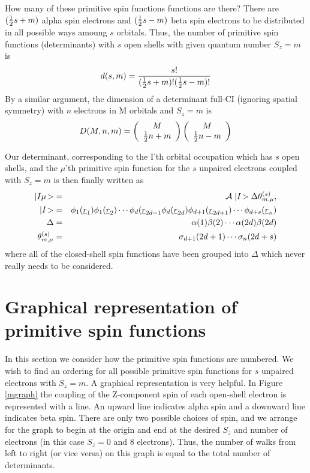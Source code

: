 How many of these primitive spin functions functions are there?  There
are $(\frac{1}{2} s + m)$ alpha spin electrons and $(\frac{1}{2} s -
m)$ beta spin electrons to be distributed in all possible ways amoung
$s$ orbitals.  Thus, the number of primitive spin functions
(determinants) with $s$ open shells with given quantum number
$S_z=m$ is
\begin{equation}
d(s,m) = \frac{s!}{(\frac{1}{2} s + m)! (\frac{1}{2} s - m)!}
\end{equation}
By a similar argument, the dimension of a determinant full-CI
(ignoring spatial symmetry) with $n$ electrons in M orbitals and
$S_z=m$ is
\begin{equation}
D(M,n,m) = \left(\begin{array}{c} M \\ \frac{1}{2} n + m \end{array}\right)\left(\begin{array}{c} M \\ \frac{1}{2} n - m \end{array}\right)
\end{equation}

Our determinant, corresponding to the I'th orbital occupation which
has $s$ open shells, and the $\mu$'th primitive spin function for
the $s$ unpaired electrons coupled with $S_z=m$ is then finally
written as
\begin{eqnarray}
  |I\mu\! > & = & {\cal A} \; |I\! > \Delta \theta^{(s)}_{m,\mu} , \\
  |I\! > & = & \phi_{1}(\underline{r}_{1})\phi_{1}(\underline{r}_{2}) \cdots \phi_{d}(\underline{r}_{2d-1}\phi_{d}(\underline{r}_{2d})
\phi_{d+1}(\underline{r}_{2d+1}) \cdots \phi_{d+s}(\underline{r}_{n}) \\
  \Delta & = &\alpha(1)\beta(2) \cdots \alpha(2d) \beta(2d) \\
  \theta^{(s)}_{m,\mu} & = & \sigma_{d+1}(2d+1) \cdots
\sigma_{n}(2d+s)
\end{eqnarray}
where all of the closed-shell spin functions have been grouped into
$\Delta$ which never really needs to be considered.

\section{Graphical representation of primitive spin functions}

In this section we consider how the primitive spin functions are
numbered.  We wish to find an ordering for all possible primitive spin
functions for $s$ unpaired electrons with $S_z = m$.  A graphical
representation is very helpful.  In Figure \ref{mgraph} the coupling
of the Z-component spin of each open-shell electron is represented
with a line.  An upward line indicates alpha spin and a downward line
indicates beta spin.  There are only two possible choices of spin, and
we arrange for the graph to begin at the origin and end at the desired
$S_z$ and number of electrons (in this case $S_z = 0$ and 8
electrons).  Thus, the number of walks from left to right (or vice
versa) on this graph is equal to the total number of determinants.

